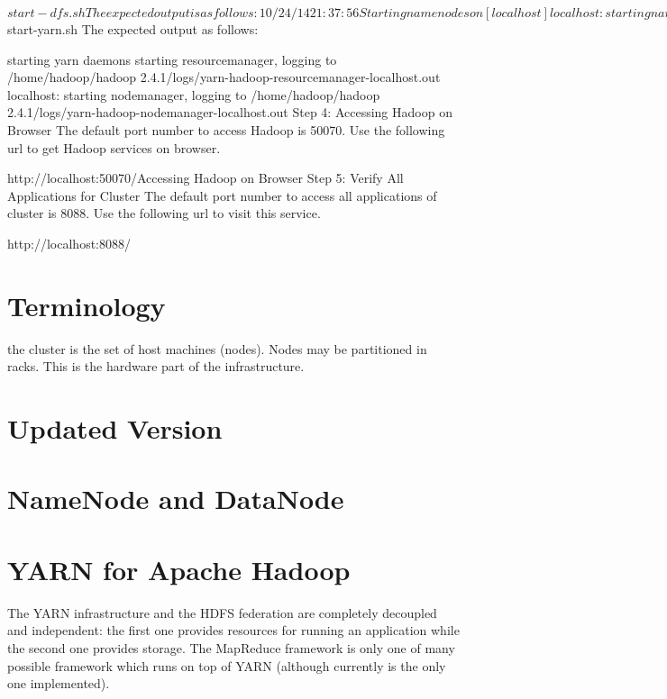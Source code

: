 $ start-dfs.sh 
The expected output is as follows:

10/24/14 21:37:56 
Starting namenodes on [localhost] 
localhost: starting namenode, logging to /home/hadoop/hadoop
2.4.1/logs/hadoop-hadoop-namenode-localhost.out 
localhost: starting datanode, logging to /home/hadoop/hadoop
2.4.1/logs/hadoop-hadoop-datanode-localhost.out 
Starting secondary namenodes [0.0.0.0]
Step 3: Verifying Yarn Script
The following command is used to start the yarn script. Executing this command will start your yarn daemons.

$ start-yarn.sh 
The expected output as follows:

starting yarn daemons 
starting resourcemanager, logging to /home/hadoop/hadoop
2.4.1/logs/yarn-hadoop-resourcemanager-localhost.out 
localhost: starting nodemanager, logging to /home/hadoop/hadoop
2.4.1/logs/yarn-hadoop-nodemanager-localhost.out 
Step 4: Accessing Hadoop on Browser
The default port number to access Hadoop is 50070. Use the following url to get Hadoop services on browser.

http://localhost:50070/Accessing Hadoop on Browser
Step 5: Verify All Applications for Cluster
The default port number to access all applications of cluster is 8088. Use the following url to visit this service.

http://localhost:8088/



\section{Terminology}
the cluster is the set of host machines (nodes). Nodes may be partitioned in racks. This is the hardware part of the infrastructure.
\section{Updated Version}
\section{NameNode and DataNode}

\section{YARN for Apache Hadoop}

The YARN infrastructure and the HDFS federation are completely decoupled and independent: the first one provides resources for running an application while the second one provides storage. The MapReduce framework is only one of many possible framework which runs on top of YARN (although currently is the only one implemented).


